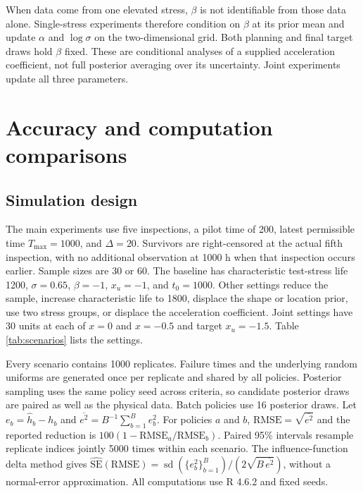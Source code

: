 \documentclass[a4paper,fleqn]{cas-sc}
\begin{document}
\begin{table}[t]
\centering
\caption{Posterior validation for representative pilot datasets.}
\label{tab:posterior}

\end{table}

When data come from one elevated stress, $\beta$ is not identifiable from those data alone. Single-stress experiments therefore condition on $\beta$ at its prior mean and update $\alpha$ and $\log\sigma$ on the two-dimensional grid. Both planning and final target draws hold $\beta$ fixed. These are conditional analyses of a supplied acceleration coefficient, not full posterior averaging over its uncertainty. Joint experiments update all three parameters.

\section{Accuracy and computation comparisons}

\subsection{Simulation design}

The main experiments use five inspections, a pilot time of 200, latest permissible time $T_{\max}=1000$, and $\Delta=20$. Survivors are right-censored at the actual fifth inspection, with no additional observation at 1000 h when that inspection occurs earlier. Sample sizes are 30 or 60. The baseline has characteristic test-stress life 1200, $\sigma=0.65$, $\beta=-1$, $x_u=-1$, and $t_0=1000$. Other settings reduce the sample, increase characteristic life to 1800, displace the shape or location prior, use two stress groups, or displace the acceleration coefficient. Joint settings have 30 units at each of $x=0$ and $x=-0.5$ and target $x_u=-1.5$. Table \ref{tab:scenarios} lists the settings.

\begin{table}[t]
\centering
\caption{Simulation settings. The target is $R(1000)$ at the indicated use stress. For two-stress rows, $n=30$ per group, giving 60 units in total.}
\label{tab:scenarios}
\resizebox{\textwidth}{!}{}
\end{table}

Every scenario contains 1000 replicates. Failure times and the underlying random uniforms are generated once per replicate and shared by all policies. Posterior sampling uses the same policy seed across criteria, so candidate posterior draws are paired as well as the physical data. Batch policies use 16 posterior draws. Let $e_b=\hat h_b-h_b$ and $\overline{e^2}=B^{-1}\sum_{b=1}^B e_b^2$. For policies $a$ and $b$, $\mathrm{RMSE}=\sqrt{\overline{e^2}}$ and the reported reduction is $100(1-\mathrm{RMSE}_a/\mathrm{RMSE}_b)$. Paired 95\% intervals resample replicate indices jointly 5000 times within each scenario. The influence-function delta method gives $\widehat{\mathrm{SE}}(\mathrm{RMSE})=\operatorname{sd}(\{e_b^2\}_{b=1}^B)/(2\sqrt{B\,\overline{e^2}})$, without a normal-error approximation. All computations use R 4.6.2 and fixed seeds.
\end{document}
